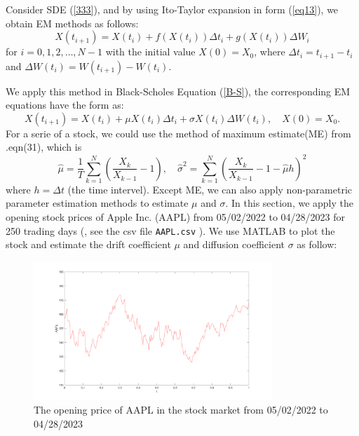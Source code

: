 \documentclass[12pt,a4paper]{article}
\theoremstyle{definition}
\begin{document}
Consider SDE (\ref{333}), and by using Ito-Taylor expansion in form (\ref{eq13}), we obtain EM methods as follows:
\begin{equation}
    \label{emmethods}X(t_{i+1})=X(t_i)+f(X(t_i))\Delta t_i + g(X(t_i))\Delta W_i
\end{equation}
for $i=0,1,2,\dots, N-1$ with the initial value $X(0)=X_0$, where $\Delta t_i=t_{i+1}-t_i$ and $\Delta W(t_i)=W(t_{i+1})-W(t_i)$.

We apply this method in Black-Scholes Equation (\ref{B-S}), the corresponding EM equations have the form as:\begin{equation}\label{emeq1}
    X(t_{i+1})=X(t_i)+\mu X(t_i)\Delta t_i+\sigma X(t_i) \Delta W(t_i),\quad X(0)=X_0.
\end{equation}
For a serie of a stock, we could use the method of maximum estimate(ME) from \cite{Lo}.eqn(31), which is \begin{equation}
    \label{esti}\hat{\mu}= \frac{1}{T}\sum_{k=1}^N\left( \frac{X_k}{X_{k-1}}-1\right),\quad \hat{\sigma}^2=\sum_{k=1}^N\left( \frac{X_k}{X_{k-1}}-1-\hat{\mu}h\right)^2
\end{equation} 
where $h=\Delta t$ (the time intervel). Except ME, we can also apply non-parametric parameter estimation methods\cite{mustafa} to estimate $\mu$ and $\sigma$. In this section, we apply the opening stock prices of Apple Inc. (AAPL) from 05/02/2022 to 04/28/2023 for 250 trading days (\cite{AAPL}, see the csv file \verb|AAPL.csv| ). We use MATLAB to plot the stock and estimate the drift coefficient $\mu$ and diffusion coefficient $\sigma$ as follow:


\begin{figure}[htbp]
\centering
\includegraphics[width=0.8\textwidth]{fig/AAPL.png}
\caption{\label{AAPLplot}The opening price of AAPL in the stock market from 05/02/2022 to 04/28/2023}
\end{figure}
\end{document}
